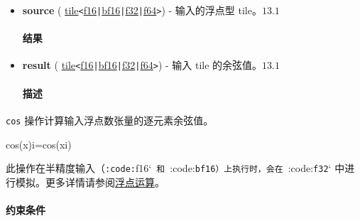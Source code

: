 \documentclass{article}
\begin{document}
\begin{itemize}
\item \textbf{source} ( \href{https://docs.nvidia.com/cuda/tile-ir/latest/sections/types.html#type-tile}{tile}\texttt{<}\href{https://docs.nvidia.com/cuda/tile-ir/latest/sections/types.html#subsection-element-types}{f16}\texttt{|}\href{https://docs.nvidia.com/cuda/tile-ir/latest/sections/types.html#subsection-element-types}{bf16}\texttt{|}\href{https://docs.nvidia.com/cuda/tile-ir/latest/sections/types.html#subsection-element-types}{f32}\texttt{|}\href{https://docs.nvidia.com/cuda/tile-ir/latest/sections/types.html#subsection-element-types}{f64}\texttt{>}) - 输入的浮点型 tile。$\boxed{13.1}$




\paragraph{结果}


\item \textbf{result} ( \href{https://docs.nvidia.com/cuda/tile-ir/latest/sections/types.html#type-tile}{tile}\texttt{<}\href{https://docs.nvidia.com/cuda/tile-ir/latest/sections/types.html#subsection-element-types}{f16}\texttt{|}\href{https://docs.nvidia.com/cuda/tile-ir/latest/sections/types.html#subsection-element-types}{bf16}\texttt{|}\href{https://docs.nvidia.com/cuda/tile-ir/latest/sections/types.html#subsection-element-types}{f32}\texttt{|}\href{https://docs.nvidia.com/cuda/tile-ir/latest/sections/types.html#subsection-element-types}{f64}\texttt{>}) - 输入 tile 的余弦值。$\boxed{13.1}$




\paragraph{描述}


\end{itemize}
\texttt{cos} 操作计算输入浮点数张量的逐元素余弦值。



cos(x)i=cos(xi)


此操作在半精度输入（\texttt{:code:}f16`\texttt{ 和 }:code:\texttt{bf16}\texttt{）上执行时，会在 }:code:\texttt{f32}` 中进行模拟。更多详情请参阅\href{https://docs.nvidia.com/cuda/tile-ir/latest/sections/operations.html#op-group-floating-point}{浮点运算}。





\paragraph{约束条件}
\end{document}
